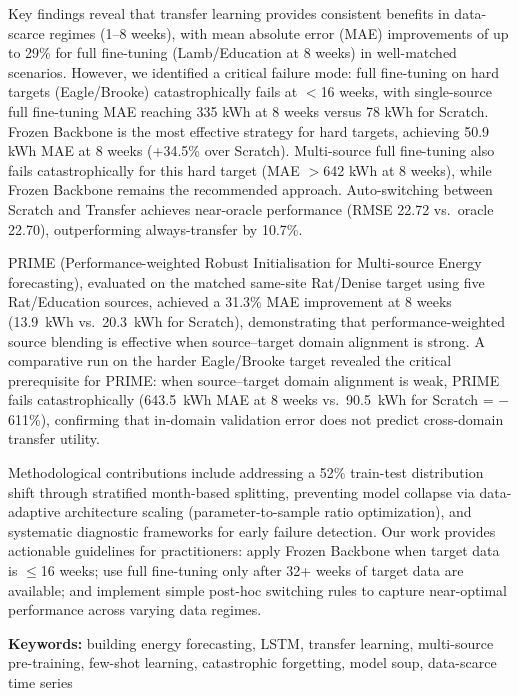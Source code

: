 \documentclass[12pt,a4paper]{report}
\begin{document}
Key findings reveal that transfer learning provides consistent benefits in data-scarce regimes (1--8 weeks), with mean absolute error (MAE) improvements of up to 29\% for full fine-tuning (Lamb/Education at 8 weeks) in well-matched scenarios. However, we identified a critical failure mode: full fine-tuning on hard targets (Eagle/Brooke) catastrophically fails at $<$16 weeks, with single-source full fine-tuning MAE reaching 335 kWh at 8 weeks versus 78 kWh for Scratch. Frozen Backbone is the most effective strategy for hard targets, achieving 50.9 kWh MAE at 8 weeks (+34.5\% over Scratch). Multi-source full fine-tuning also fails catastrophically for this hard target (MAE $>$642 kWh at 8 weeks), while Frozen Backbone remains the recommended approach. Auto-switching between Scratch and Transfer achieves near-oracle performance (RMSE 22.72 vs.\ oracle 22.70), outperforming always-transfer by 10.7\%.

PRIME (Performance-weighted Robust Initialisation for Multi-source Energy forecasting), evaluated on the matched same-site Rat/Denise target using five Rat/Education sources, achieved a 31.3\% MAE improvement at 8 weeks (13.9~kWh vs.\ 20.3~kWh for Scratch), demonstrating that performance-weighted source blending is effective when source--target domain alignment is strong. A comparative run on the harder Eagle/Brooke target revealed the critical prerequisite for PRIME: when source--target domain alignment is weak, PRIME fails catastrophically (643.5~kWh MAE at 8 weeks vs.\ 90.5~kWh for Scratch = $-$611\%), confirming that in-domain validation error does not predict cross-domain transfer utility.

Methodological contributions include addressing a 52\% train-test distribution shift through stratified month-based splitting, preventing model collapse via data-adaptive architecture scaling (parameter-to-sample ratio optimization), and systematic diagnostic frameworks for early failure detection. Our work provides actionable guidelines for practitioners: apply Frozen Backbone when target data is $\leq$16 weeks; use full fine-tuning only after 32+ weeks of target data are available; and implement simple post-hoc switching rules to capture near-optimal performance across varying data regimes.

\vspace{0.5cm}

\noindent\textbf{Keywords:} building energy forecasting, LSTM, transfer learning, multi-source pre-training, few-shot learning, catastrophic forgetting, model soup, data-scarce time series
\end{document}
